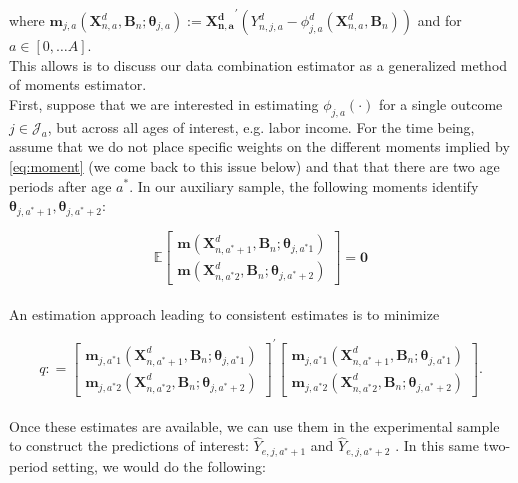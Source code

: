 \noindent where $\bm{m}_{j,a} \left( \bm{X}_{n,a}^d, \bm{B}_{n} ; \bm{\theta}_{j,a} \right) := {\bm{X_{n,a}^d}}^{'} \left( Y_{n,j,a}^d -   \phi^d_{j,a} \left( \bm{X}_{n,a}^d, \bm{B}_{n} \right) \right)$ and for $a \in [0, \ldots A]$.\\

\noindent This allows is to discuss our data combination estimator as a generalized method of moments estimator.\\

\noindent First, suppose that we are interested in estimating $\phi_{j,a} \left( \cdot \right)$ for a single outcome $j \in \mathcal{J}_{a}$, but across all ages of interest, e.g. labor income. For the time being, assume that we do not place specific weights on the different moments implied by \eqref{eq:moment} (we come back to this issue below) and that that there are two age periods after age $a^*$. In our auxiliary sample, the following moments identify $\bm{\theta}_{j,a^*+1}, \bm{\theta}_{j,a^*+2}$: 

\begin{equation}
\mathbb{E}
\begin{bmatrix}
\bm{m} \left( \bm{X}_{n,a^*+1}^d, \bm{B}_{n}; \bm{\theta}_{j,a^*1} \right) \\ \bm{m} \left( \bm{X}_{n,a^*2}^d, \bm{B}_{n}; \bm{\theta}_{j,a^*+2} \right) 
\end{bmatrix}
= \bm{0}
\end{equation}\\

\noindent An estimation approach leading to consistent estimates is to minimize

\begin{equation}
q : = 
{\begin{bmatrix}
\bm{m}_{j,a^*1} \left( \bm{X}_{n,a^*+1}^d, \bm{B}_{n}; \bm{\theta}_{j,a^*1} \right) \\ \bm{m}_{j,a^*2} \left( \bm{X}_{n,a^*2}^d, \bm{B}_{n}; \bm{\theta}_{j,a^*+2} \right) 
\end{bmatrix}}^{'}
\begin{bmatrix}
\bm{m}_{j,a^*1} \left( \bm{X}_{n,a^*+1}^d, \bm{B}_{n}; \bm{\theta}_{j,a^*1} \right) \\ \bm{m}_{j,a^*2} \left( \bm{X}_{n,a^*2}^d, \bm{B}_{n}; \bm{\theta}_{j,a^*+2} \right) 
\end{bmatrix}. 
\end{equation}\\

\noindent Once these estimates are available, we can use them in the experimental sample to construct the predictions of interest: $\hat{Y}_{e,j,a^*+1}$ and $\hat{Y}_{e,j,a^*+2}$ . In this same two-period setting, we would do the following: 

